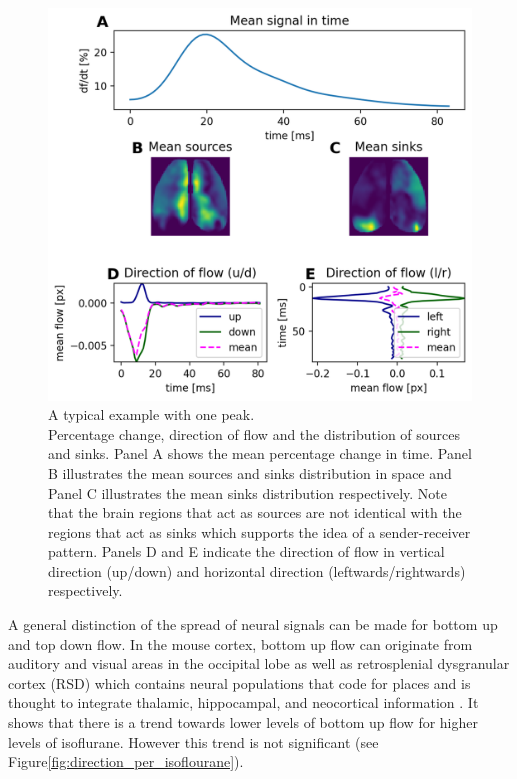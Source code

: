 \begin{figure}[!htb]
\centering
\includegraphics[width=\textwidth,height=\textheight,keepaspectratio]{Figures/percentage_change_direction_of_flow_and_sources_sinks}
\decoRule
\caption[A typical example with one peak]{A typical example with one peak.\\Percentage change, direction of flow and the distribution of sources and sinks. Panel A shows the mean percentage change in time. Panel B illustrates the mean sources and sinks distribution in space and Panel C illustrates the mean sinks distribution respectively. Note that the brain regions that act as sources are not identical with the regions that act as sinks which supports the idea of a sender-receiver pattern. Panels D and E indicate the direction of flow in vertical direction (up/down) and horizontal direction (leftwards/rightwards) respectively.}
\label{fig:percentage_change_direction_of_flow_and_sources_sinks}
\end{figure}
A general distinction of the spread of neural signals can be made for bottom up and top down flow. In the mouse cortex, bottom up flow can originate from auditory and visual areas in the occipital lobe as well as retrosplenial dysgranular cortex (RSD) which contains neural populations that code for places and is thought to integrate thalamic, hippocampal, and neocortical information \parencite{milczarek2018spatial, van1992connections}. It shows that there is a trend towards lower levels of bottom up flow for higher levels of isoflurane. However this trend is not significant (see Figure\ref{fig:direction_per_isoflourane}).\\
